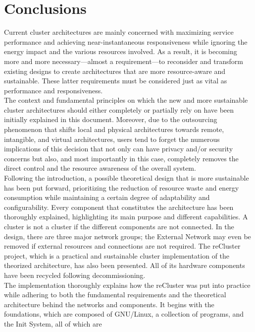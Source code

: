 \chapter{Conclusions}
\label{cha:conclusions}

Current cluster architectures are mainly concerned with maximizing service performance
and achieving near-instantaneous responsiveness while ignoring the energy impact
and the various resources involved. As a result, it is becoming more and more necessary---almost
a requirement---to reconsider and transform existing designs to create architectures
that are more resource-aware and sustainable. These latter requirements must be
considered just as vital as performance and responsiveness. \\ %
The context and fundamental principles on which the new and more sustainable
cluster architectures should either completely or partially rely on have been
initially explained in this document. Moreover, due to the outsourcing
phenomenon that shifts local and physical architectures towards remote, intangible,
and virtual architectures, users tend to forget the numerous implications of this
decision that not only can have privacy and/or security concerns but also, and
most importantly in this case, completely removes the direct control and the resource
awareness of the overall system. \\ %
Following the introduction, a possible theoretical design that is more
sustainable has been put forward, prioritizing the reduction of resource waste and
energy consumption while maintaining a certain degree of adaptability and configurability.
Every component that constitutes the architecture has been thoroughly explained,
highlighting its main purpose and different capabilities. A cluster is not a
cluster if the different components are not connected. In the design, there are
three major network groups; the External Network may even be removed if external
resources and connections are not required. The reCluster project, which is a practical
and sustainable cluster implementation of the theorized architecture, has also
been presented. All of its hardware components have been recycled following decommissioning.
\\ %
The implementation thoroughly explains how the reCluster was put into practice while
adhering to both the fundamental requirements and the theoretical architecture behind
the networks and components. It begins with the foundations, which are composed of
GNU/Linux, a collection of programs, and the Init System, all of which are
